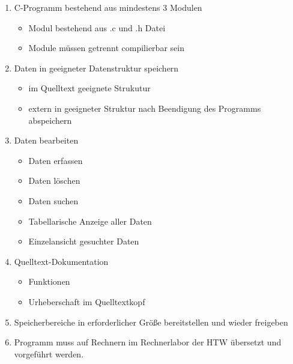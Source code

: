 \begin{enumerate}
\item C-Programm bestehend aus mindestens 3 Modulen
\begin{itemize}
\item Modul bestehend aus .c und .h Datei
\item Module müssen getrennt compilierbar sein
\end{itemize}
\item Daten in geeigneter Datenstruktur speichern
\begin{itemize}
\item im Quelltext geeignete Strukutur
\item extern in geeigneter Struktur nach Beendigung des Programms abspeichern
\end{itemize}
\item Daten bearbeiten
\begin{itemize}
\item Daten erfassen
\item Daten löschen
\item Daten suchen
\item Tabellarische Anzeige aller Daten
\item Einzelansicht gesuchter Daten
\end{itemize}
\item Quelltext-Dokumentation
\begin{itemize}
\item Funktionen
\item Urheberschaft im Quelltextkopf
\end{itemize}
\item Speicherbereiche in erforderlicher Größe bereitstellen und wieder freigeben
\item Programm muss auf Rechnern im Rechnerlabor der HTW übersetzt und vorgeführt werden.
\end{enumerate}


